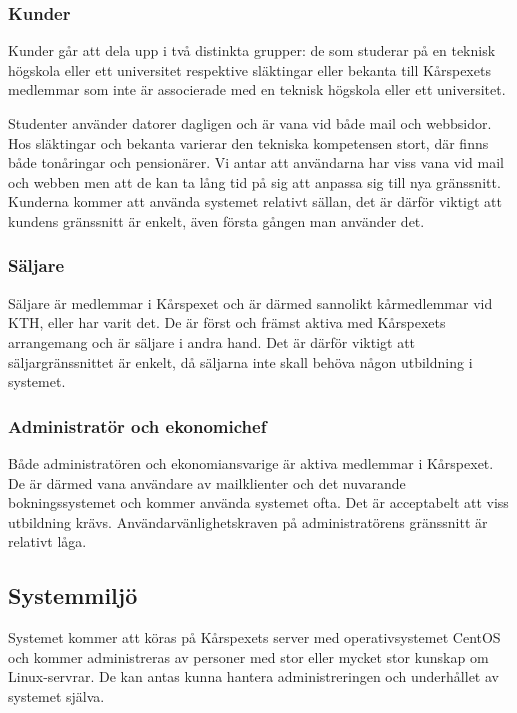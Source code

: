 \documentclass[a4paper, twoside, 11pt, titlepage]{article}
\begin{document}
		\subsubsection{Kunder}


		Kunder går att dela upp i två distinkta grupper: de som studerar på en teknisk högskola eller ett universitet respektive släktingar eller bekanta till Kårspexets medlemmar som inte är associerade med en teknisk högskola eller ett universitet.

		Studenter använder datorer dagligen och är vana vid både mail och webbsidor. Hos släktingar och bekanta varierar den tekniska kompetensen stort, där finns både tonåringar och pensionärer. Vi antar att användarna har viss vana vid mail och webben men att de kan ta lång tid på sig att anpassa sig till nya gränssnitt. Kunderna kommer att använda systemet relativt sällan, det är därför viktigt att kundens gränssnitt är enkelt, även första gången man använder det.

		\subsubsection{Säljare}


		Säljare är medlemmar i Kårspexet och är därmed sannolikt kårmedlemmar vid KTH, eller har varit det. De är först och främst aktiva med Kårspexets arrangemang och är säljare i andra hand. Det är därför viktigt att säljargränssnittet är enkelt, då säljarna inte skall behöva någon utbildning i systemet.

		\subsubsection{Administratör och ekonomichef}


		Både administratören och ekonomiansvarige är aktiva medlemmar i Kårspexet. De är därmed vana användare av mailklienter och det nuvarande bokningssystemet och kommer använda systemet ofta. Det är acceptabelt att viss utbildning krävs. Användarvänlighetskraven på administratörens gränssnitt är relativt låga.

	\subsection{Systemmiljö}


	Systemet kommer att köras på Kårspexets server med operativsystemet CentOS och kommer administreras av personer med stor eller mycket stor kunskap om Linux-servrar. De kan antas kunna hantera administreringen och underhållet av systemet själva.
\end{document}
